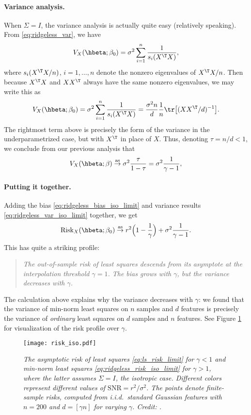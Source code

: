 \documentclass{article}
\begin{document}
\paragraph{Variance analysis.}

When $\Sigma = I$, the variance analysis is actually quite easy (relatively
speaking). From \eqref{eq:ridgeless_var}, we have
\[
V_X(\hbeta; \beta_0) = \sigma^2 \sum_{i=1}^n \frac{1}{s_i(X^\T X)},
\]
where $s_i(X^\T X/n)$, $i=1,\dots,n$ denote the nonzero eigenvalues of $X^\T  
X/n$. Then because $X^\T X$ and $XX^\T$ always have the same nonzero
eigenvalues, we may write this as
\[
V_X(\hbeta; \beta_0) = \sigma^2 \sum_{i=1}^n \frac{1}{s_i(X^\T X)} = 
\frac{\sigma^2 n}{d} \frac{1}{n} \tr\big[ (XX^\T /d)^{-1} \big].
\]
The rightmost term above is precisely the form of the variance in the
underparametrized case, but with $X^\T$ in place of $X$. Thus, denoting $\tau =
n/d < 1$, we conclude from our previous analysis that  
\begin{equation}
\label{eq:ridgeless_var_iso_limit}
V_X(\hbeta; \beta) \asto \sigma^2 \frac{\tau}{1-\tau} = \sigma^2 
\frac{1}{\gamma-1},  
\end{equation}

\paragraph{Putting it together.}

Adding the bias \eqref{eq:ridgeless_bias_iso_limit} and variance results
\eqref{eq:ridgeless_var_iso_limit} together, we get
\begin{equation}
\label{eq:ridgeless_risk_iso_limit}
\Risk_X(\hbeta; \beta_0) \asto r^2 \Big( 1- \frac{1}{\gamma} \Big) + \sigma^2 
\frac{1}{\gamma-1}. 
\end{equation}
This has quite a striking profile:
\begin{quote}
\centering\it
The out-of-sample risk of least squares descends from its asymptote at the
interpolation threshold $\gamma = 1$. The bias grows with $\gamma$, but 
the variance decreases with $\gamma$.      
\end{quote}
The calculation above explains why the variance decreases with $\gamma$: we
found that the variance of min-norm least squares on $n$ samples and $d$
features is precisely the variance of \emph{ordinary} least squares on $d$
samples and $n$ features. See Figure \ref{fig:risk_iso} for visualization of the
risk profile over $\gamma$.

\begin{figure}[htb]
\centering
\texttt{[image: risk\_iso.pdf]}
\caption{\it The asymptotic risk of least squares \eqref{eq:ls_risk_limit} for
  $\gamma<1$ and min-norm least squares \eqref{eq:ridgeless_risk_iso_limit} for 
  $\gamma>1$, where the latter assumes $\Sigma = I$, the isotropic case.
  Different colors represent different values of $\mathrm{SNR} = r^2 /
  \sigma^2$. The points denote finite-sample risks, computed from i.i.d.\ 
  standard Gaussian features with $n=200$ and $d=[\gamma n]$ for varying
  $\gamma$. Credit: \citet{hastie2022surprises}.}  
\label{fig:risk_iso}
\end{figure}
\end{document}
